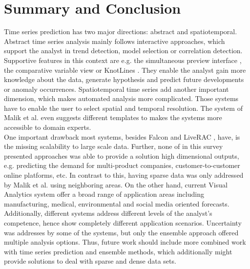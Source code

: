 \documentclass[electronic]{vgtc}             %
\begin{document}
\section{Summary and Conclusion}
Time series prediction has two major directions: abstract and spatiotemporal.
Abstract time series analysis mainly follows interactive approaches, which
support the analyst in trend detection, model selection or correlation detection. 
Supportive features in this context are e.g. the simultaneous preview interface \cite{buono:2007}, the comparative variable view \cite{steed:2017} or KnotLines \cite{Xie:2014}.
They enable the analyst gain more knowledge about the data, generate hypothesis and predict future developments or anomaly occurrences.
Spatiotemporal time series add another important dimension, which makes automated analysis more complicated. 
Those systems have to enable the user to select spatial and temporal resolution.
The system of Malik et al. \cite{malik:2014} even suggests different templates to makes the systems more accessible to domain experts.\\
One important drawback most systems, besides Falcon \cite{steed:2017} and LiveRAC \cite{McLachlan:2008}, have, is the missing scalability to large scale data. 
Further, none of in this survey presented approaches was able to provide a solution high dimensional outputs, e.g. predicting the demand for multi-product companies, customer-to-customer online platforms, etc.
In contrast to this, having sparse data was only addressed by Malik et al. \cite{malik:2014} using neighboring areas.
On the other hand, current Visual Analytics system offer a broad range of application areas including manufacturing, medical, environmental and social media oriented forecasts.
Additionally, different systems address different levels of the analyst's competence, hence show completely different application scenarios. 
Uncertainty was addresses by some of the systems, but only the ensemble approach \cite{koepp:2014} offered multiple analysis options.
Thus, future work should include more combined work with time series prediction and ensemble methods, which additionally might provide solutions to deal with sparse and dense data sets.

%
%
%

%


\end{document}
